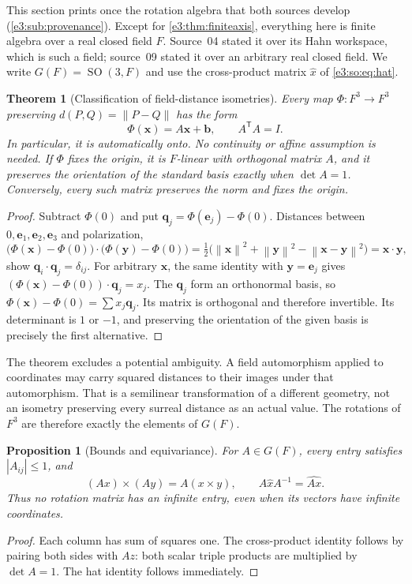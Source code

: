 \documentclass[11pt,letterpaper]{article}
\numberwithin{equation}{section}
\newtheorem{theorem}{Theorem}[section]
\newtheorem{proposition}[proposition]{Proposition}
\theoremstyle{definition}
\theoremstyle{remark}
\newcommand{\SO}{\operatorname{SO}}
\newcommand{\norm}[1]{\left\lVert#1\right\rVert}
\newcommand{\abs}[1]{\left|#1\right|}
\newcommand{\vv}[1]{\bm{#1}}
\newcommand{\transpose}{^{\mathsf T}}
\begin{document}
This section prints once the rotation algebra that both sources develop
(\cref{e3:sub:provenance}). Except for \cref{e3:thm:finiteaxis}, everything here
is finite algebra over a real closed field $F$. Source~04 stated it over its
Hahn workspace, which is such a field; source~09 stated it over an arbitrary
real closed field. We write $G(F)=\SO(3,F)$ and use the cross-product matrix
$\widehat x$ of \cref{e3:so:eq:hat}.

\begin{theorem}[Classification of field-distance isometries]\label{e3:thm:isometries}\label{e3:so:thm:isometries}
Every map $\Phi:F^3\to F^3$ preserving $d(P,Q)=\norm{P-Q}$ has the form
\[
 \Phi(\vv x)=A\vv x+\vv b,\qquad A\transpose A=I.
\]
In particular, it is automatically onto. No continuity or affine assumption
is needed. If $\Phi$ fixes the origin, it is $F$-linear with orthogonal matrix
$A$, and it preserves the orientation of the standard basis exactly when
$\det A=1$. Conversely, every such matrix preserves the norm and fixes the
origin.
\end{theorem}
\begin{proof}
Subtract $\Phi(0)$ and put $\vv q_j=\Phi(\vv e_j)-\Phi(0)$. Distances between
$0,\vv e_1,\vv e_2,\vv e_3$ and polarization,
\[
 \bigl(\Phi(\vv x)-\Phi(0)\bigr)\cdot\bigl(\Phi(\vv y)-\Phi(0)\bigr)
 =\tfrac12\bigl(\norm{\vv x}^2+\norm{\vv y}^2-\norm{\vv x-\vv y}^2\bigr)
 =\vv x\cdot\vv y,
\]
show $\vv q_i\cdot\vv q_j=\delta_{ij}$. For arbitrary $\vv x$, the same identity
with $\vv y=\vv e_j$ gives $(\Phi(\vv x)-\Phi(0))\cdot\vv q_j=x_j$. The $\vv q_j$
form an orthonormal basis, so $\Phi(\vv x)-\Phi(0)=\sum x_j\vv q_j$. Its matrix
is orthogonal and therefore invertible. Its determinant is $1$ or $-1$, and
preserving the orientation of the given basis is precisely the first
alternative.
\end{proof}

The theorem excludes a potential ambiguity. A field automorphism applied to
coordinates may carry squared distances to their images under that automorphism.
That is a semilinear transformation of a different geometry, not an isometry
preserving every surreal distance as an actual value. The rotations of $F^3$
are therefore exactly the elements of $G(F)$.

\begin{proposition}[Bounds and equivariance]\label{e3:so:prop:bounds}
For $A\in G(F)$, every entry satisfies $\abs{A_{ij}}\le1$, and
\[
 (Ax)\times(Ay)=A(x\times y),\qquad
 A\widehat{x}A^{-1}=\widehat{Ax}.
\]
Thus no rotation matrix has an infinite entry, even when its vectors have
infinite coordinates.
\end{proposition}
\begin{proof}
Each column has sum of squares one. The cross-product identity follows by
pairing both sides with $Az$: both scalar triple products are multiplied by
$\det A=1$. The hat identity follows immediately.
\end{proof}
\end{document}
